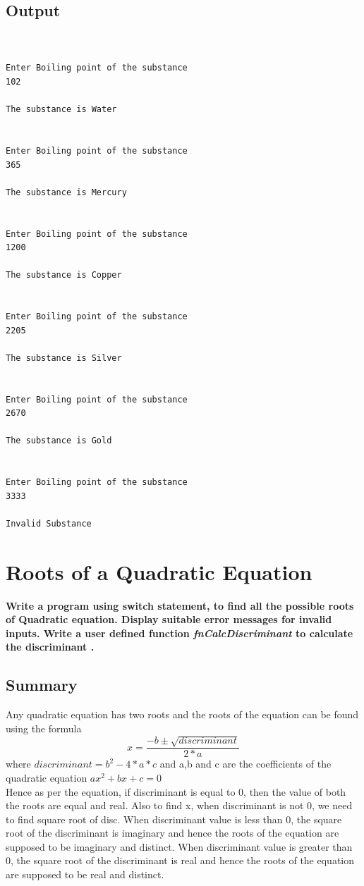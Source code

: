 \documentclass[a4paper]{report}
\begin{document}
\section*{Output}
\begin{Verbatim}


Enter Boiling point of the substance
102

The substance is Water


Enter Boiling point of the substance
365

The substance is Mercury


Enter Boiling point of the substance
1200

The substance is Copper


Enter Boiling point of the substance
2205

The substance is Silver


Enter Boiling point of the substance
2670

The substance is Gold


Enter Boiling point of the substance
3333

Invalid Substance

\end{Verbatim}

\chapter{Roots of a Quadratic Equation}
{\selectfont \textbf{Write a program using switch statement, to find all the possible roots of Quadratic equation. Display suitable error messages for invalid inputs.  Write a user defined function \textit{fnCalcDiscriminant} to calculate the discriminant .
}}
\section*{Summary}
Any quadratic equation has two roots and the roots of the equation can be found using the formula
\[x=\frac{-b\pm\sqrt{discriminant}}{2*a}\] where \(discriminant={b^{2}-4*a*c}\) and a,b and c are the coefficients of the quadratic equation \textbf{\(ax^{2}+bx+c=0\)}\\
Hence as per the equation, if discriminant is equal to 0, then the value of both the roots are equal and real. Also to find x, when discriminant is not 0, we need to find square root of disc. When discriminant value is less than 0, the square root of the discriminant is imaginary and hence the roots of the equation are supposed to be imaginary and distinct. When discriminant value is greater than 0, the square root of the discriminant is real and hence the roots of the equation are supposed to be real and distinct.
\end{document}
